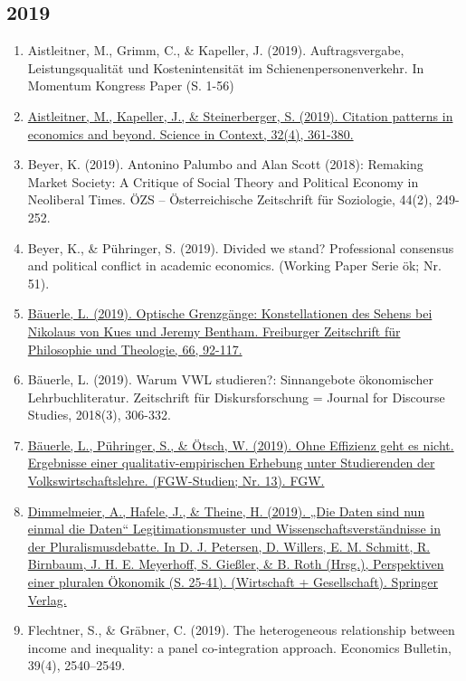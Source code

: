 \subsection*{2019}
\begin{enumerate}
	 \item Aistleitner, M., Grimm, C., \& Kapeller, J. (2019). Auftragsvergabe, Leistungsqualität und Kostenintensität im Schienenpersonenverkehr. In Momentum Kongress Paper (S. 1-56)
	 \item \href{https://doi.org/10.1017/S0269889720000022}{Aistleitner, M., Kapeller, J., \& Steinerberger, S. (2019). Citation patterns in economics and beyond. Science in Context, 32(4), 361-380.}
	 \item Beyer, K. (2019). Antonino Palumbo and Alan Scott (2018): Remaking Market Society: A Critique of Social Theory and Political Economy in Neoliberal Times. ÖZS -- Österreichische Zeitschrift für Soziologie, 44(2), 249-252.
	 \item Beyer, K., \& Pühringer, S. (2019). Divided we stand? Professional consensus and political conflict in academic economics. (Working Paper Serie ök; Nr. 51).
	 \item \href{https://doi.org/10.5169/seals-869321}{Bäuerle, L. (2019). Optische Grenzgänge: Konstellationen des Sehens bei Nikolaus von Kues und Jeremy Bentham. Freiburger Zeitschrift für Philosophie und Theologie, 66, 92-117.}
	 \item Bäuerle, L. (2019). Warum VWL studieren?: Sinnangebote ökonomischer Lehrbuchliteratur. Zeitschrift für Diskursforschung = Journal for Discourse Studies, 2018(3), 306-332.
	 \item \href{https://www.ssoar.info/ssoar/handle/document/67301}{Bäuerle, L., Pühringer, S., \& Ötsch, W. (2019). \glqq Ohne Effizienz geht es nicht\grqq{}. Ergebnisse einer qualitativ-empirischen Erhebung unter Studierenden der Volkswirtschaftslehre. (FGW-Studien; Nr. 13). FGW.}
	 \item \href{https://doi.org/10.1007/978-3-658-16145-3_2}{Dimmelmeier, A., Hafele, J., \& Theine, H. (2019). „Die Daten sind nun einmal die Daten“ Legitimationsmuster und Wissenschaftsverständnisse in der Pluralismusdebatte. In D. J. Petersen, D. Willers, E. M. Schmitt, R. Birnbaum, J. H. E. Meyerhoff, S. Gießler, \& B. Roth (Hrsg.), Perspektiven einer pluralen Ökonomik (S. 25-41). (Wirtschaft + Gesellschaft). Springer Verlag.}
	 \item Flechtner, S., \& Gräbner, C. (2019). The heterogeneous relationship between income and inequality: a panel co-integration approach. Economics Bulletin, 39(4), 2540–2549.

\end{enumerate}
